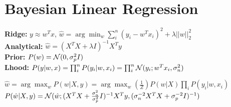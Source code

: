 \begin{comment}
	\pagebreak
\end{comment}

\section{Bayesian Linear Regression}
\begin{comment}
	\textbf{Goal:} Use data ($\cX \text{ } \cY$) to fit a function ($\cX \rightarrow \cY$).
	Use this function to predict unseen data.\\
\end{comment}

\textbf{Ridge:} $y \approx w^Tx$, $\hat{w} = \arg\min_w \sum_i^n(y_i - w^Tx_i)^2 + \lambda ||w||^2_2$\\
\textbf{Analytical:} $\hat{w} = (X^TX + \lambda I)^{-1} X^Ty$\\

\textbf{Prior:} $P(w) = \mathcal{N}(0,\sigma^2_p I)$ \\
\textbf{Lhood:} $P(y|w,x) = \prod_i^n P(y_i | w,x_i) = \prod_i^n \mathcal{N}(y_i; w^Tx_i, \sigma^2_n)$\\
\begin{comment}
In Bayes, we assume that y is not estimated as a single value, but drawn from a distribution.\\
\end{comment}

$\hat{w} = \arg\max_w P(w|X,y) = \arg\max_w (\frac{1}{Z}) P(w|X) \prod_i P(y_i|w,x_i)$\\
$P(\hat{w}|X,y) = \mathcal{N}(\hat{w}; (X^TX + \frac{\sigma_n^2}{\sigma_p^2}I)^{-1} X^Ty, (\sigma_n^{-2}X^TX + \sigma_p^{-2}I)^{-1})$\\
\begin{comment} 
	Assumes the weights to be Gaussian and the noise of the labels from $P(y|x,w)$ to be i.i.d. Gaussian.\\
	If we would not assume a prior, we would get the MLE, which are simply mean and variance of the given data (No regularization in Ridge regression).\\
	$\lambda$ is the ratio $\frac{\sigma^2_n}{\sigma^2_p}$ of noise in y to the variance of the weights \\
	\textbf{Derivation:} Maximize the posterior by using Bayes rule, Ridge regression $\Rightarrow$ MAP weight estimate.\\
	 Use the definition of P(w) and $P(y|w,x)$ and remove constants to derive ridge regression.\\
\end{comment}

